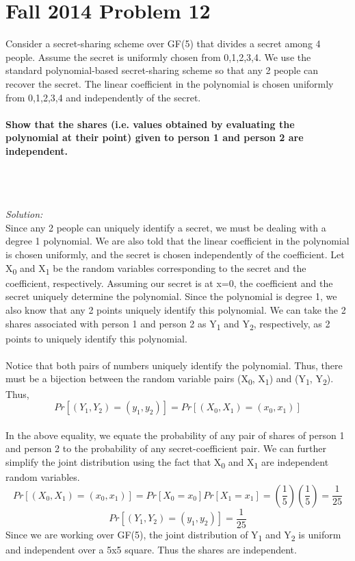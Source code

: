 \documentclass{article}
\begin{document}
\section{Fall 2014 Problem 12}
\begin{question}
Consider a secret-sharing scheme over GF(5) that divides a secret among 4 people. Assume the secret is
uniformly chosen from 0,1,2,3,4. We use the standard polynomial-based secret-sharing scheme so that any
2 people can recover the secret. The linear coefficient in the polynomial is chosen uniformly from 0,1,2,3,4
and independently of the secret.
\\ \\ \textbf{Show that the shares (i.e. values obtained by evaluating the polynomial at their point) given to person
1 and person 2 are independent.} 
\\\\
\\\\
\begin{solution}
\textit{Solution:}
\\Since any 2 people can uniquely identify a secret, we must be dealing with a degree 1 polynomial. We are also told that the linear coefficient in the polynomial is chosen uniformly, and the secret is chosen independently of the coefficient. Let X\textsubscript{0} and X\textsubscript{1} be the random variables corresponding to the secret and the coefficient, respectively. Assuming our secret is at x=0, the coefficient and the secret uniquely determine the polynomial. Since the polynomial is degree 1, we also know that any 2 points uniquely identify this polynomial. We can take the 2 shares associated with person 1 and person 2 as Y\textsubscript{1} and Y\textsubscript{2}, respectively, as 2 points to uniquely identify this polynomial.
\\\\Notice that both pairs of numbers uniquely identify the polynomial. Thus, there must be a bijection between the random variable pairs (X\textsubscript{0}, X\textsubscript{1}) and (Y\textsubscript{1}, Y\textsubscript{2}).
\\Thus,
\[Pr[(Y_1, Y_2) =(y_1, y_2)] = Pr[(X_0, X_1) =(x_0, x_1)] \]
\\In the above equality, we equate the probability of any pair of shares of person 1 and person 2 to the probability of any secret-coefficient pair. We can further simplify the joint distribution using the fact that X\textsubscript{0} and X\textsubscript{1} are independent random variables.
\[Pr[(X_0, X_1) =(x_0, x_1)] = Pr[X_0 =x_0]Pr[X_1 =x_1] = (\frac{1}{5})(\frac{1}{5}) = \frac{1}{25}\]
\[Pr[(Y_1, Y_2) =(y_1, y_2)] = \frac{1}{25}\]
Since we are working over GF(5), the joint distribution of Y\textsubscript{1} and Y\textsubscript{2} is uniform and independent over a 5x5 square. Thus the shares are independent.

\end{solution}


\end{question}
\end{document}
